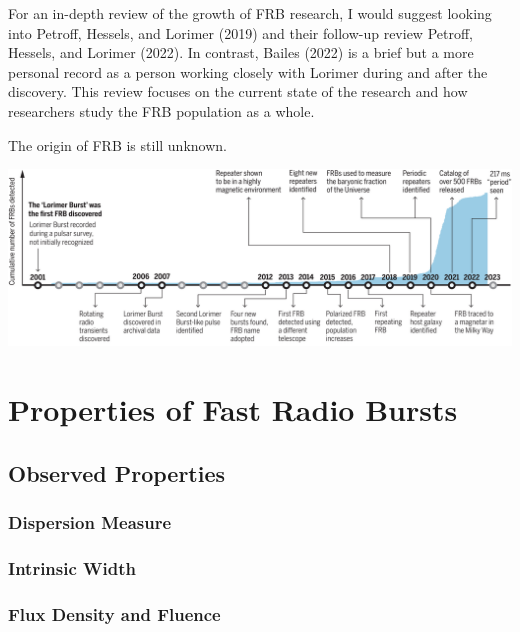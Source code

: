 \documentclass[
  letterpaper,
  DIV=11,
  numbers=noendperiod]{scrreport}
\begin{document}
For an in-depth review of the growth of FRB research, I would suggest
looking into Petroff, Hessels, and Lorimer (2019) and their follow-up
review Petroff, Hessels, and Lorimer (2022). In contrast, Bailes (2022)
is a brief but a more personal record as a person working closely with
Lorimer during and after the discovery. This review focuses on the
current state of the research and how researchers study the FRB
population as a whole.

The origin of FRB is still unknown.

\includegraphics{././_assets/frb-research-review_C_Bailes2022.jpg}


\hypertarget{properties-of-fast-radio-bursts}{%
\chapter{Properties of Fast Radio
Bursts}\label{properties-of-fast-radio-bursts}}

\hypertarget{observed-properties}{%
\section{Observed Properties}\label{observed-properties}}

\hypertarget{sec-prop-dm}{%
\subsection{Dispersion Measure}\label{sec-prop-dm}}

\hypertarget{intrinsic-width}{%
\subsection{Intrinsic Width}\label{intrinsic-width}}

\hypertarget{flux-density-and-fluence}{%
\subsection{Flux Density and Fluence}\label{flux-density-and-fluence}}
\end{document}
